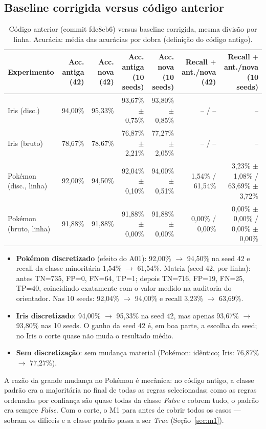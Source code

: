 \documentclass[a4paper,11pt]{article}
\begin{document}
\subsection{Baseline corrigida versus c\'odigo anterior}
\begin{table}[htbp]
\centering
\small
\caption{Código anterior (commit fdc8cb6) versus baseline corrigida, mesma divisão por linha. Acurácia: média das acurácias por dobra (definição do código antigo).}
\label{tab:antigo_novo}
\begin{tabular}{lrrrrrr}
\toprule
Experimento & Acc. antiga (42) & Acc. nova (42) & Acc. antiga (10 seeds) & Acc. nova (10 seeds) & Recall $+$ ant./nova (42) & Recall $+$ ant./nova (10 seeds) \\
\midrule
Iris (disc.) & 94,00\% & 95,33\% & 93,67\% $\pm$ 0,75\% & 93,80\% $\pm$ 0,85\% & -- / -- & -- \\
Iris (bruto) & 78,67\% & 78,67\% & 76,87\% $\pm$ 2,21\% & 77,27\% $\pm$ 2,05\% & -- / -- & -- \\
Pokémon (disc., linha) & 92,00\% & 94,50\% & 92,04\% $\pm$ 0,10\% & 94,00\% $\pm$ 0,51\% & 1,54\% / 61,54\% & 3,23\% $\pm$ 1,08\% / 63,69\% $\pm$ 3,72\% \\
Pokémon (bruto, linha) & 91,88\% & 91,88\% & 91,88\% $\pm$ 0,00\% & 91,88\% $\pm$ 0,00\% & 0,00\% / 0,00\% & 0,00\% $\pm$ 0,00\% / 0,00\% $\pm$ 0,00\% \\
\bottomrule
\end{tabular}
\end{table}


\begin{itemize}
  \item \textbf{Pok\'emon discretizado} (efeito do A01): 92,00\% $\to$ 94,50\% na seed 42 e recall da classe minorit\'aria 1,54\% $\to$ 61,54\%. Matriz (seed 42, por linha): antes TN=735, FP=0, FN=64, TP=1; depois TN=716, FP=19, FN=25, TP=40, coincidindo exatamente com o valor medido na auditoria do orientador. Nas 10 seeds: 92,04\% $\to$ 94,00\% e recall 3,23\% $\to$ 63,69\%.
  \item \textbf{Iris discretizado}: 94,00\% $\to$ 95,33\% na seed 42, mas apenas 93,67\% $\to$ 93,80\% nas 10 seeds. O ganho da seed 42 \'e, em boa parte, a escolha da seed; no Iris o corte quase n\~ao muda o resultado m\'edio.
  \item \textbf{Sem discretiza\c{c}\~ao}: sem mudan\c{c}a material (Pok\'emon: id\^entico; Iris: 76,87\% $\to$ 77,27\%).
\end{itemize}
A raz\~ao da grande mudan\c{c}a no Pok\'emon \'e mecânica: no c\'odigo antigo, a classe padr\~ao era a majorit\'aria no final de todas as regras selecionadas; como as regras ordenadas por confian\c{c}a s\~ao quase todas da classe \emph{False} e cobrem tudo, o padr\~ao era sempre \emph{False}. Com o corte, o M1 para antes de cobrir todos os casos --- sobram os dif\'iceis e a classe padr\~ao passa a ser \emph{True} (Se\c{c}\~ao~\ref{sec:m1}).
\end{document}

